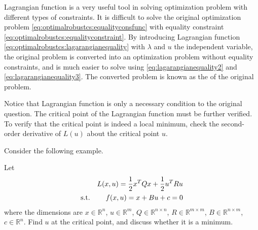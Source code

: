 Lagrangian function is a very useful tool in solving optimization problem with different types of constraints. It is difficult to solve the original optimization problem \eqref{eq:optimalrobustcs:equalityconsfunc} with equality constraint \eqref{eq:optimalrobustcs:equalityconstraint}. By introducing Lagrangian function \eqref{eq:optimalrobustcs:lagarangianequality} with $\lambda$ and $u$ the independent variable, the original problem is converted into an optimization problem without equality constraints, and is much easier to solve using \eqref{eq:lagarangianequality2} and \eqref{eq:lagarangianequality3}. The converted problem is known as the  of the original problem. 

Notice that Lagrangian function is only a necessary condition to the original question. The critical point of the Lagrangian function must be further verified. To verify that the critical point is indeed a local minimum, check the second-order derivative of $L(u)$ about the critical point $u$.

Consider the following example.
\begin{shortbox}

Let
\begin{eqnarray}
	&& L(x, u) = \dfrac{1}{2}x^TQx + \dfrac{1}{2}u^TRu \label{eq:optimalrobustcs:quadraticsurfexp1} \\
	\textup{s.t.} && f(x, u) = x + Bu + c = 0 \nonumber
\end{eqnarray}
where the dimensions are $x\in\mathbb{R}^n$, $u\in\mathbb{R}^m$, $Q\in\mathbb{R}^{n\times n}$, $R\in\mathbb{R}^{m\times m}$, $B\in\mathbb{R}^{n\times m}$, $c\in\mathbb{R}^n$. Find $u$ at the critical point, and discuss whether it is a minimum.

\end{shortbox}

